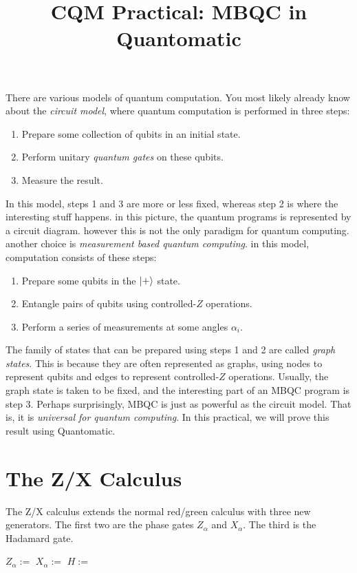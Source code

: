 \documentclass{article}
\title{CQM Practical: MBQC in Quantomatic}
\begin{document}
\maketitle

There are various models of quantum computation. You most likely already know about the \textit{circuit model}, where quantum computation is performed in three steps:

\begin{enumerate}
  \item Prepare some collection of qubits in an initial state.
  \item Perform unitary \textit{quantum gates} on these qubits.
  \item Measure the result.
\end{enumerate}

In this model, steps 1 and 3 are more or less fixed, whereas step 2 is where the interesting stuff happens. in this picture, the quantum programs is represented by a circuit diagram. however this is not the only paradigm for quantum computing. another choice is \textit{measurement based quantum computing}. in this model, computation consists of these steps:

\begin{enumerate}
  \item Prepare some qubits in the $\left| + \right\rangle$ state.
  \item Entangle pairs of qubits using controlled-$Z$ operations.
  \item Perform a series of measurements at some angles $\alpha_i$.
\end{enumerate}

The family of states that can be prepared using steps 1 and 2 are called \textit{graph states}. This is because they are often represented as graphs, using nodes to represent qubits and edges to represent controlled-$Z$ operations. Usually, the graph state is taken to be fixed, and the interesting part of an MBQC program is step 3. Perhaps surprisingly, MBQC is just as powerful as the circuit model. That is, it is \textit{universal for quantum computing}. In this practical, we will prove this result using Quantomatic.

\section*{The Z/X Calculus}

The Z/X calculus extends the normal red/green calculus with three new generators. The first two are the phase gates $Z_\alpha$ and $X_\alpha$. The third is the Hadamard gate.
\begin{center}
    $Z_\alpha :=$ 
    \qquad\qquad
    $X_\alpha :=$ 
    \qquad\qquad
    $H := $ 
\end{center}
\end{document}

